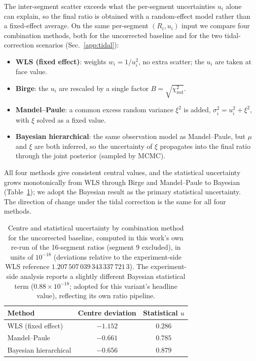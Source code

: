 \documentclass[11pt,a4paper]{article}
\begin{document}
The inter-segment scatter exceeds what the per-segment uncertainties
$u_i$ alone can explain, so the final ratio is obtained with a
random-effect model rather than a fixed-effect average. On the same
per-segment $(R_i, u_i)$ input we compare four combination methods, both
for the uncorrected baseline and for the two tidal-correction scenarios
(Sec.~\ref{app:tidal}):
\begin{itemize}
  \item \textbf{WLS (fixed effect)}: weights $w_i = 1/u_i^{2}$, no
        extra scatter; the $u_i$ are taken at face value.
  \item \textbf{Birge}: the $u_i$ are rescaled by a single factor
        $B = \sqrt{\chi^{2}_{\mathrm{red}}}$.
  \item \textbf{Mandel--Paule}: a common excess random variance
        $\xi^{2}$ is added, $\sigma_i^{2} = u_i^{2} + \xi^{2}$, with
        $\xi$ solved as a fixed value.
  \item \textbf{Bayesian hierarchical}: the same observation model as
        Mandel--Paule, but $\mu$ and $\xi$ are both inferred, so the
        uncertainty of $\xi$ propagates into the final ratio through the
        joint posterior (sampled by MCMC).
\end{itemize}
All four methods give consistent central values, and the statistical
uncertainty grows monotonically from WLS through Birge and Mandel--Paule
to Bayesian (Table~\ref{tab:appendix-methods}); we adopt the Bayesian
result as the primary statistical uncertainty. The direction of change
under the tidal correction is the same for all four methods.

\begin{table}[t]
  \centering
  \caption{Centre and statistical uncertainty by combination method for
  the uncorrected baseline, computed in this work's own re-run of the
  16-segment ratios (segment 9 excluded), in units of $10^{-18}$
  (deviations relative
  to the experiment-side WLS reference $1.207\,507\,039\,343\,337\,721\,3$).
  The experiment-side analysis reports a slightly different Bayesian
  statistical term ($0.88\times10^{-18}$; adopted for this variant's
  headline value), reflecting its own ratio pipeline.}
  \label{tab:appendix-methods}
  \begin{tabular}{lcc}
    \toprule
    Method & Centre deviation & Statistical $u$ \\
    \midrule
    WLS (fixed effect)       & $-1.152$ & $0.286$ \\
    Mandel--Paule            & $-0.661$ & $0.785$ \\
    Bayesian hierarchical    & $-0.656$ & $0.879$ \\
    \bottomrule
  \end{tabular}
\end{table}
\end{document}
